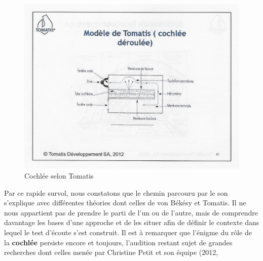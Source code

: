 \begin{figure}
	\centering
	\includegraphics[width=1.0\linewidth]{images/Cochleederoule_haut.jpg}
	\caption[Cochlée selon Tomatis]{Cochlée selon Tomatis}
	\label{fig:cochleederoulehaut}
\end{figure}
Par ce rapide survol, nous constatons que  le 
chemin 
parcouru par 
le son s'explique avec différentes théories  dont celles de von Békésy et 
Tomatis. Il ne nous appartient pas de prendre le parti de l'un ou de l'autre, mais de comprendre 
davantage les bases d'une approche  et de les situer  afin de définir  le 
contexte dans lequel le test d'écoute s'est construit.
Il est à 
remarquer que l'énigme du 
rôle de la \textbf{cochlée}  persiste encore et toujours, l'audition restant 
sujet de grandes 
recherches dont celles menée par Christine Petit  et son équipe (2012, 
